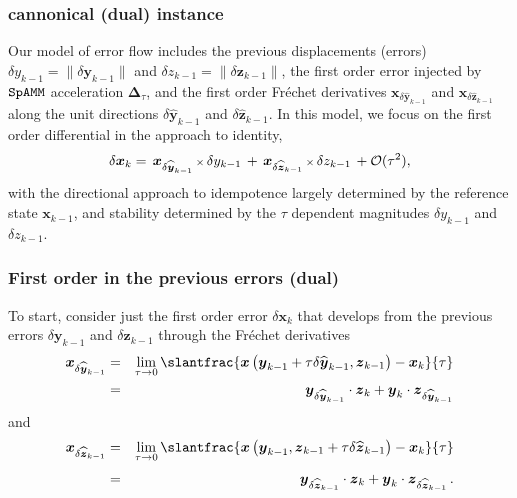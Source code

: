 \documentclass[letterpaper,twocolumn,amsmath,amsfont,amssymb,english,aps,jcp,preprintnumbers,groupaddress,nofootinbib,tightenlines]{revtex4}
\newcommand{\mat}[1]{\boldsymbol{#1}}
\begin{document}
\subsubsection{cannonical (dual) instance}


  Our model of error flow
includes the previous displacements (errors) $\delta y_{k-1} = \lVert \delta \mat{y}_{k-1} \rVert$  and  $\delta z_{k-1}=\lVert \delta \mat{z}_{k-1} \rVert$,
the first order error injected by $\tt SpAMM$ acceleration $\mat{\Delta}_\tau$,  and the first order
Fr\'{e}chet derivatives \cite{} ${\mat{x}}_{\delta \widehat{\mat{y}}_{k-1}}$ and ${\mat{x}}_{\delta \widehat{ \mat{z}}_{k-1}}$ 
along the unit directions  $\delta \widehat{\mat{y}}_{k-1}$ and $\delta \widehat{\mat{z}}_{k-1}$.
In this model, we focus on the first order differential in the approach to identity, 
\begin{equation} \label{firstorder}
\delta \mat{x}_k = \,  { \mat{x}}_{\delta \widehat{\mat{y}}_{k-1}}  \, {\scriptstyle \times} \, \delta y_{k-1} 
                 \, + \,  { \mat{x}}_{\delta \widehat{\mat{z}}_{k-1}}  \, {\scriptstyle \times} \, \delta z_{k-1}  \, + {\cal O}(\tau^2) ,
\end{equation}
with the directional approach to idempotence largely determined by the reference state $\mat{x}_{k-1}$, and stability determined by
the $\tau$ dependent magnitudes $\delta y_{k-1}$  and $\delta z_{k-1}$. 
 
\subsubsection{First order in the previous errors (dual)}

To start, consider just the first order error $\delta \mat{x}_k$ that develops from the previous errors $\delta \mat{y}_{k-1}$
and $\delta \mat{z}_{k-1}$ through the Fr\'{e}chet derivatives \cite{}
\begin{eqnarray}
  \mat{x}_{\delta \widehat{ \mat{y}}_{k-1}} 
&=& \lim_{\tau \rightarrow 0} \slantfrac{ \mat{x} \left( \mat{y}_{k-1} + \tau \delta \widehat{\mat{y}}_{k-1} ,  {\mat{z}}_{k-1}  \right)
                                     -\mat{x}_k    }{\tau}  \nonumber  \\
&=&   \mat{y}_{\delta \widehat{ \mat{y}}_{k-1}} \cdot \mat{z}_{k}  + \mat{y}_{k}  \cdot \mat{z}_{\delta \widehat{ \mat{y}}_{k-1}} 
 \end{eqnarray}
and 
 \begin{eqnarray}
 \mat{x}_{\delta \widehat{ \mat{z}}_{k-1}} &=& \lim_{\tau \rightarrow 0} 
\slantfrac{ \mat{x} \left( {\mat{y}}_{k-1} , \mat{z}_{k-1} +\tau  \delta \widehat{\mat{z}}_{k-1} \right) - \mat{x}_k   }{\tau} \nonumber  \\[0.1cm] 
&=& \mat{y}_{\delta \widehat{ \mat{z}}_{k-1}} \cdot \mat{z}_{k}  + \mat{y}_{k}  \cdot \mat{z}_{\delta \widehat{ \mat{z}}_{k-1}} \, . 
 \end{eqnarray}
\end{document}
